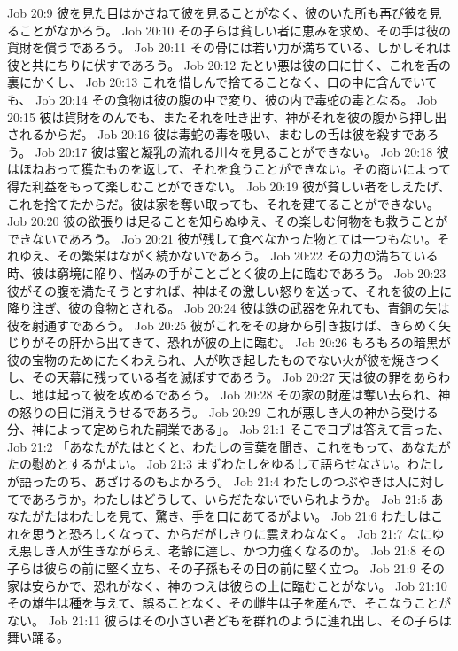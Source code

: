 Job 20:9  彼を見た目はかさねて彼を見ることがなく、彼のいた所も再び彼を見ることがなかろう。
Job 20:10  その子らは貧しい者に恵みを求め、その手は彼の貨財を償うであろう。
Job 20:11  その骨には若い力が満ちている、しかしそれは彼と共にちりに伏すであろう。
Job 20:12  たとい悪は彼の口に甘く、これを舌の裏にかくし、
Job 20:13  これを惜しんで捨てることなく、口の中に含んでいても、
Job 20:14  その食物は彼の腹の中で変り、彼の内で毒蛇の毒となる。
Job 20:15  彼は貨財をのんでも、またそれを吐き出す、神がそれを彼の腹から押し出されるからだ。
Job 20:16  彼は毒蛇の毒を吸い、まむしの舌は彼を殺すであろう。
Job 20:17  彼は蜜と凝乳の流れる川々を見ることができない。
Job 20:18  彼はほねおって獲たものを返して、それを食うことができない。その商いによって得た利益をもって楽しむことができない。
Job 20:19  彼が貧しい者をしえたげ、これを捨てたからだ。彼は家を奪い取っても、それを建てることができない。
Job 20:20  彼の欲張りは足ることを知らぬゆえ、その楽しむ何物をも救うことができないであろう。
Job 20:21  彼が残して食べなかった物とては一つもない。それゆえ、その繁栄はながく続かないであろう。
Job 20:22  その力の満ちている時、彼は窮境に陥り、悩みの手がことごとく彼の上に臨むであろう。
Job 20:23  彼がその腹を満たそうとすれば、神はその激しい怒りを送って、それを彼の上に降り注ぎ、彼の食物とされる。
Job 20:24  彼は鉄の武器を免れても、青銅の矢は彼を射通すであろう。
Job 20:25  彼がこれをその身から引き抜けば、きらめく矢じりがその肝から出てきて、恐れが彼の上に臨む。
Job 20:26  もろもろの暗黒が彼の宝物のためにたくわえられ、人が吹き起したものでない火が彼を焼きつくし、その天幕に残っている者を滅ぼすであろう。
Job 20:27  天は彼の罪をあらわし、地は起って彼を攻めるであろう。
Job 20:28  その家の財産は奪い去られ、神の怒りの日に消えうせるであろう。
Job 20:29  これが悪しき人の神から受ける分、神によって定められた嗣業である」。
Job 21:1  そこでヨブは答えて言った、
Job 21:2  「あなたがたはとくと、わたしの言葉を聞き、これをもって、あなたがたの慰めとするがよい。
Job 21:3  まずわたしをゆるして語らせなさい。わたしが語ったのち、あざけるのもよかろう。
Job 21:4  わたしのつぶやきは人に対してであろうか。わたしはどうして、いらだたないでいられようか。
Job 21:5  あなたがたはわたしを見て、驚き、手を口にあてるがよい。
Job 21:6  わたしはこれを思うと恐ろしくなって、からだがしきりに震えわななく。
Job 21:7  なにゆえ悪しき人が生きながらえ、老齢に達し、かつ力強くなるのか。
Job 21:8  その子らは彼らの前に堅く立ち、その子孫もその目の前に堅く立つ。
Job 21:9  その家は安らかで、恐れがなく、神のつえは彼らの上に臨むことがない。
Job 21:10  その雄牛は種を与えて、誤ることなく、その雌牛は子を産んで、そこなうことがない。
Job 21:11  彼らはその小さい者どもを群れのように連れ出し、その子らは舞い踊る。
